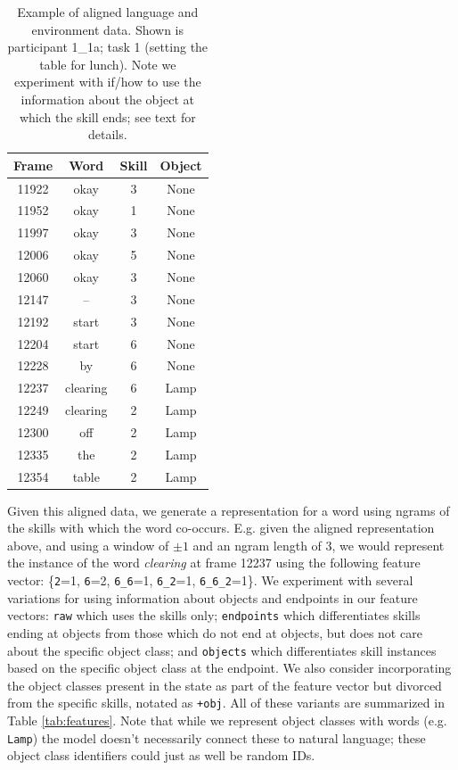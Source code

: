 \documentclass[11pt]{article}
\begin{document}
\begin{table}[ht!]
\centering
\begin{tabular}{|cccc|}
\hline
Frame & Word & Skill & Object  \\\hline
11922   & okay  &  3 &      None\\
11952   & okay   & 1  &     None\\
11997   & okay  &  3   &    None\\
12006   & okay  &  5   &    None\\
12060   & okay  &  3   &    None\\
12147   & --      &3   &    None\\
12192   & start   &3     &  None\\
12204   & start   &6     &  None\\
12228   & by      &6     &  None\\
12237   & clearing    &    6    &   Lamp\\
12249   &clearing  &      2    &   Lamp\\
12300   &off     &2      & Lamp\\
12335   &the     &2      & Lamp\\
12354   &table  & 2     &  Lamp\\
\hline
\end{tabular}
\caption{Example of aligned language and environment data. Shown is participant 1\_1a; task 1 (setting the table for lunch). Note we experiment with if/how to use the information about the object at which the skill ends; see text for details.}
\label{tab:aligned}
\end{table}

Given this aligned data, we generate a representation for a word using ngrams of the skills with which the word co-occurs. E.g. given the aligned representation above, and using a window of $\pm1$ and an ngram length of 3, we would represent the instance of the word \textit{clearing} at frame 12237 using the following feature vector: \{\texttt{2}=1, \texttt{6}=2, \texttt{6\_6}=1, \texttt{6\_2}=1, \texttt{6\_6\_2}=1\}. We experiment with several variations for using information about objects and endpoints in our feature vectors: \texttt{raw} which uses the skills only; \texttt{endpoints} which differentiates skills ending at objects from those which do not end at objects, but does not care about the specific object class; and \texttt{objects} which differentiates skill instances based on the specific object class at the endpoint. We also consider incorporating the object classes present in the state as part of the feature vector but divorced from the specific skills, notated as \texttt{+obj}. All of these variants are summarized in Table \ref{tab:features}. Note that while we represent object classes with words (e.g. \texttt{Lamp}) the model doesn't necessarily connect these to natural language; these object class identifiers could just as well be random IDs. 
\end{document}
